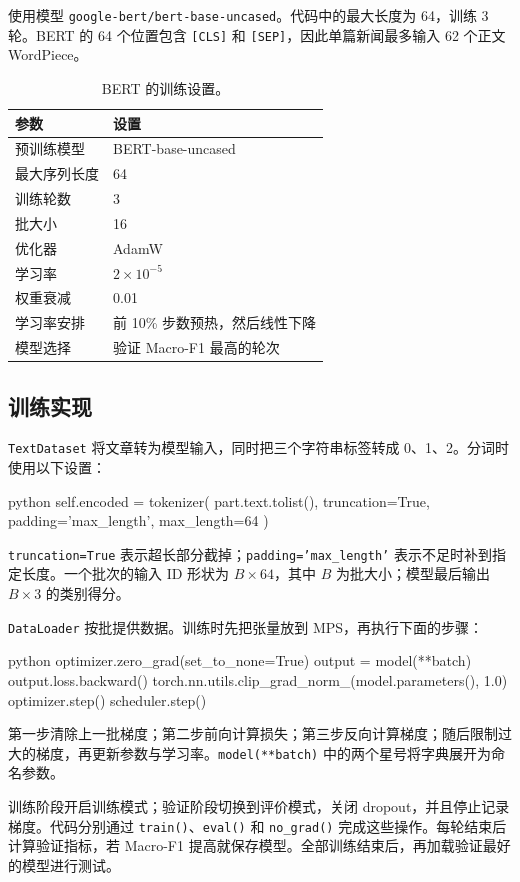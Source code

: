 \documentclass[12pt, a4paper, fontset=fandol]{ctexart}
\begin{document}
使用模型 \texttt{google-bert/bert-base-uncased}。代码中的最大长度为 64，训练 3 轮。BERT 的 64 个位置包含 \texttt{[CLS]} 和 \texttt{[SEP]}，因此单篇新闻最多输入 62 个正文 WordPiece。
\begin{table}[H]\centering
\begin{tabular}{ll}\hline\hline
参数 & 设置\\\hline
预训练模型 & BERT-base-uncased\\
最大序列长度 & 64\\
训练轮数 & 3\\
批大小 & 16\\
优化器 & AdamW\\
学习率 & $2\times10^{-5}$\\
权重衰减 & 0.01\\
学习率安排 & 前 10\% 步数预热，然后线性下降\\
模型选择 & 验证 Macro-F1 最高的轮次\\\hline\hline
\end{tabular}
\caption{BERT 的训练设置。}
\end{table}

\subsection{训练实现}
\texttt{TextDataset} 将文章转为模型输入，同时把三个字符串标签转成 0、1、2。分词时使用以下设置：
\begin{mycode}{python}
self.encoded = tokenizer(
    part.text.tolist(), truncation=True,
    padding='max_length', max_length=64
)
\end{mycode}
\texttt{truncation=True} 表示超长部分截掉；\texttt{padding='max\_length'} 表示不足时补到指定长度。一个批次的输入 ID 形状为 $B\times64$，其中 $B$ 为批大小；模型最后输出 $B\times3$ 的类别得分。

\texttt{DataLoader} 按批提供数据。训练时先把张量放到 MPS，再执行下面的步骤：
\begin{mycode}{python}
optimizer.zero_grad(set_to_none=True)
output = model(**batch)
output.loss.backward()
torch.nn.utils.clip_grad_norm_(model.parameters(), 1.0)
optimizer.step()
scheduler.step()
\end{mycode}
第一步清除上一批梯度；第二步前向计算损失；第三步反向计算梯度；随后限制过大的梯度，再更新参数与学习率。\texttt{model(**batch)} 中的两个星号将字典展开为命名参数。

训练阶段开启训练模式；验证阶段切换到评价模式，关闭 dropout，并且停止记录梯度。代码分别通过 \texttt{train()}、\texttt{eval()} 和 \texttt{no\_grad()} 完成这些操作。每轮结束后计算验证指标，若 Macro-F1 提高就保存模型。全部训练结束后，再加载验证最好的模型进行测试。
\end{document}
